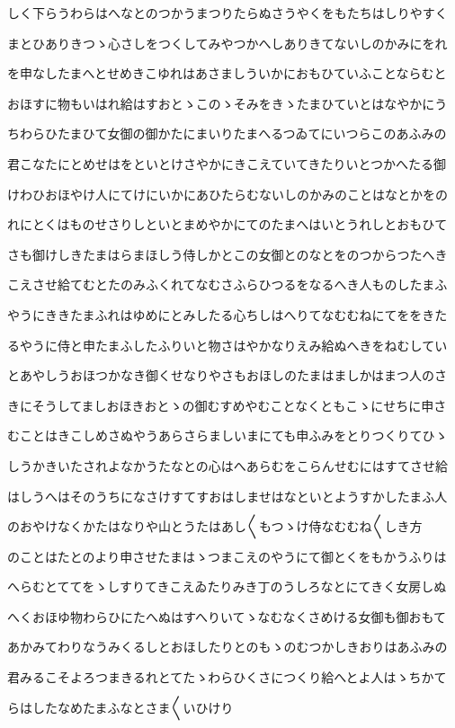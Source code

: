 \documentclass[a4paper,11pt,landscape]{ltjtarticle}
\begin{document}
\par\medskip
しく下らうわらはへなとのつかうまつりたらぬさうやくをもたちはしりやすく
\par\medskip
まとひありきつゝ心さしをつくしてみやつかへしありきてないしのかみにをれ
\par\medskip
を申なしたまへとせめきこゆれはあさましういかにおもひていふことならむと
\par\medskip
おほすに物もいはれ給はすおとゝこのゝそみをきゝたまひていとはなやかにう
\par\medskip
ちわらひたまひて女御の御かたにまいりたまへるつゐてにいつらこのあふみの
\par\medskip
君こなたにとめせはをといとけさやかにきこえていてきたりいとつかへたる御
\par\medskip
けわひおほやけ人にてけにいかにあひたらむないしのかみのことはなとかをの
\par\medskip
れにとくはものせさりしといとまめやかにてのたまへはいとうれしとおもひて
\par\medskip
さも御けしきたまはらまほしう侍しかとこの女御とのなとをのつからつたへき
\par\medskip
こえさせ給てむとたのみふくれてなむさふらひつるをなるへき人ものしたまふ
\par\medskip
やうにききたまふれはゆめにとみしたる心ちしはへりてなむむねにてををきた
\par\medskip
るやうに侍と申たまふしたふりいと物さはやかなりえみ給ぬへきをねむしてい
\par\medskip
とあやしうおほつかなき御くせなりやさもおほしのたまはましかはまつ人のさ
\par\medskip
きにそうしてましおほきおとゝの御むすめやむことなくともこゝにせちに申さ
\par\medskip
むことはきこしめさぬやうあらさらましいまにても申ふみをとりつくりてひゝ
\par\medskip
しうかきいたされよなかうたなとの心はへあらむをこらんせむにはすてさせ給
\par\medskip
はしうへはそのうちになさけすてすおはしませはなといとようすかしたまふ人
\par\medskip
のおやけなくかたはなりや山とうたはあし〱もつゝけ侍なむむね〱しき方
\par\medskip
のことはたとのより申させたまはゝつまこえのやうにて御とくをもかうふりは
\par\medskip
へらむとててをゝしすりてきこえゐたりみき丁のうしろなとにてきく女房しぬ
\par\medskip
へくおほゆ物わらひにたへぬはすへりいてゝなむなくさめける女御も御おもて
\par\medskip
あかみてわりなうみくるしとおほしたりとのもゝのむつかしきおりはあふみの
\par\medskip
君みるこそよろつまきるれとてたゝわらひくさにつくり給へとよ人はゝちかて
\par\medskip
らはしたなめたまふなとさま〱いひけり
\par\medskip
\end{document}
